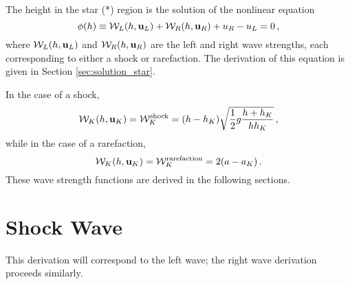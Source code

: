 The height in the star (*) region is the solution of the nonlinear equation
\begin{equation}\label{eq:objective_function}
  \phi(h) \equiv
    \mathcal{W}_L(h,\mathbf{u}_L)
    + \mathcal{W}_R(h,\mathbf{u}_R)
    + u_R - u_L
    = 0 \,,
\end{equation}
where $\mathcal{W}_L(h,\mathbf{u}_L)$ and
$\mathcal{W}_R(h,\mathbf{u}_R)$
are the left and right wave strengths, each corresponding to either a shock
or rarefaction. The derivation of this equation is given in Section \ref{sec:solution_star}.

In the case of a shock,
\begin{equation}
  \mathcal{W}_K(h,\mathbf{u}_K) = \mathcal{W}_K^{\text{shock}} = 
    (h - h_K)\sqrt{\frac{1}{2}g\frac{h + h_K}
    {hh_K}}
    \,,
\end{equation}
while in the case of a rarefaction,
\begin{equation}
  \mathcal{W}_K(h,\mathbf{u}_K) = \mathcal{W}_K^{\text{rarefaction}} = 
    2(a - a_K)
    \,.
\end{equation}
These wave strength functions are derived in the following sections.

\section{Shock Wave}
This derivation will correspond to the left wave; the right wave derivation
proceeds similarly.

